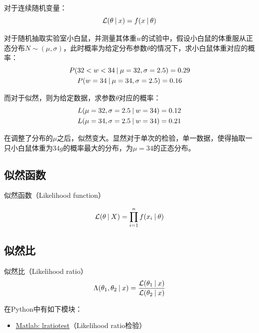 \documentclass[11pt]{article}
\begin{document}
对于连续随机变量：
\begin{equation*}
    \mathcal{L}(\theta\:\vert\: x) = f(x\:\vert\: \theta)
\end{equation*}

\begin{example}
    对于随机抽取实验室小白鼠，并测量其体重$w$的试验中，假设小白鼠的体重服从正态分布$N\sim(\mu,\sigma)$，此时概率为给定分布参数$\theta$的情况下，求小白鼠体重对应的概率：
    \begin{gather*}
        P( 32<w<34 \:\vert\: \mu= 32,\sigma=2.5) = 0.29 \\
        P( w=34 \:\vert\: \mu=34,\sigma=2.5) = 0.16
    \end{gather*}

    而对于似然，则为给定数据，求参数$\theta$对应的概率：
    \begin{gather*}
        L( \mu=32,\sigma=2.5 \:\vert\: w=34) = 0.12 \\
        L( \mu=34,\sigma=2.5 \:\vert\: w=34) = 0.21
    \end{gather*}

    在调整了分布的$\mu$之后，似然变大。显然对于单次的检验，单一数据，使得抽取一只小白鼠体重为$34g$的概率最大的分布，为$\mu=34$的正态分布。
\end{example}

\subsection{似然函数}

似然函数（Likelihood function）

\begin{equation*}
    \mathcal{L}(\theta \:\vert\: X) = \prod_{i=1}^{n} f(x_i \:\vert\: \theta)
\end{equation*}

\subsection{似然比}

似然比（Likelihood ratio）
\begin{equation*}
    \Lambda(\theta_1,\theta_2 \:\vert\: x) = \frac{\mathcal{L}(\theta_1 \:\vert\: x)}{\mathcal{L}(\theta_2 \:\vert\: x)}
\end{equation*}

\begin{remark}
    在Python中有如下模块：
    \begin{itemize}
        \item \href{https://www.mathworks.com/help/econ/lratiotest.html}{Matlab: lratiotest}（Likelihood ratio检验）
    \end{itemize}
\end{remark}
\end{document}
